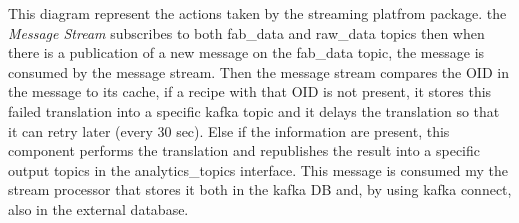 This diagram represent the actions taken by the streaming platfrom package. the \textit{Message Stream} subscribes to both fab\_data and raw\_data topics then when there is a publication of a new message on the fab\_data topic, the message is consumed by the message stream. Then the message stream compares the OID in the message to its cache, if a recipe with that OID is not present, it stores this failed translation into a specific kafka topic and it delays the translation so that it can retry later (every 30 sec). Else if the information are present, this component performs the translation and republishes the result into a specific output topics in the analytics\_topics interface. This message is consumed my the stream processor that stores it both in the kafka DB and, by using kafka connect, also in the external database.